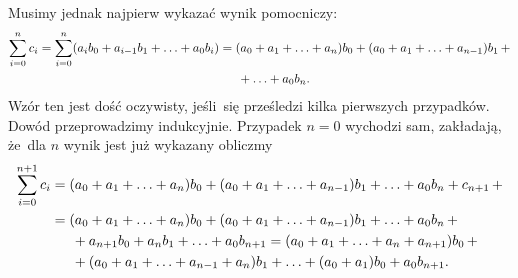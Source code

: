 \documentclass[a4paper,11pt]{article}
\begin{document}
Musimy jednak najpierw wykazać wynik pomocniczy:
\begin{equation}
  \label{eq:Leja-22}
  \begin{split}
    \sum_{ i = 0 }^{ n } c_{ i } = \sum_{ i = 0 }^{ n } ( a_{ i } b_{
      0 } + a_{ i - 1 } b_{ 1 } + \ldots + a_{ 0 } b_{ i } ) &= ( a_{ 0 }
    + a_{ 1 } + \ldots + a_{ n } ) b_{ 0 } + ( a_{ 0 } + a_{ 1 }
    + \ldots + a_{ n - 1 } ) b_{ 1 } \, + \\
    &\hspace{1.5em} + \ldots + a_{ 0 } b_{ n }.
  \end{split}
\end{equation}
Wzór ten jest dość oczywisty, jeśli~się prześledzi kilka pierwszych
przypadków. Dowód przeprowadzimy indukcyjnie. Przypadek $n = 0$
wychodzi sam, zakładają, że~dla $n$ wynik jest już wykazany obliczmy
\begin{equation}
  \label{eq:Leja-23}
  \begin{split}
    \sum_{ i = 0 }^{ n + 1 } c_{ i }
    &= ( a_{ 0 } + a_{ 1 } + \ldots +
    a_{ n } ) b_{ 0 } + ( a_{ 0 } + a_{ 1 } + \ldots + a_{ n - 1 } ) b_{
      1 } + \ldots + a_{ 0 } b_{ n } + c_{ n + 1 } \, + \\
    &= ( a_{ 0 } + a_{ 1 } + \ldots + a_{ n } ) b_{ 0 } + ( a_{ 0 } + a_{
      1 }
    + \ldots + a_{ n - 1 } ) b_{ 1 } + \ldots + a_{ 0 } b_{ n } \, + \\
    &\hspace{1.5em}
      + a_{ n + 1 } b_{ 0 } + a_{ n } b_{ 1 } + \ldots + a_{ 0 } b_{ n + 1
    }
    = ( a_{ 0 } + a_{ 1 } + \ldots + a_{ n } + a_{ n + 1 } ) b_{ 0 } \, + \\
    &\hspace{1.5em} + ( a_{ 0 } + a_{ 1 } + \ldots + a_{ n - 1 } + a_{ n } ) b_{ 1 } +
    \ldots + ( a_{ 0 } + a_{ 1 } ) b_{ 0 } + a_{ 0 } b_{ n + 1 }.
  \end{split}
\end{equation}
\end{document}
